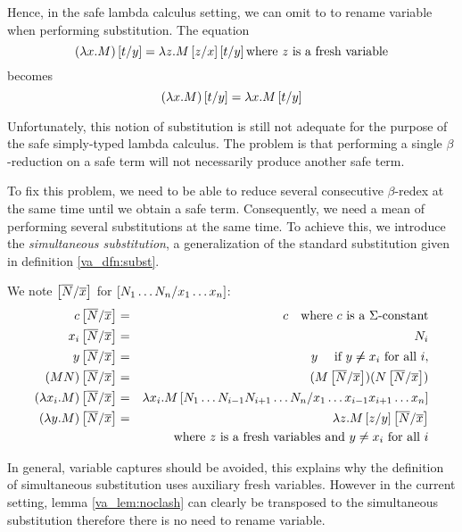 Hence, in the safe lambda calculus setting, we can omit to
to rename variable when performing substitution. The equation
$$(\lambda x . M) \left[ t/y \right] = \lambda z . M \left[ z/x \right]
\left[ t/y \right] \mbox{where $z$ is a fresh variable}$$
becomes
$$(\lambda x . M) \left[ t/y \right] = \lambda x . M \left[ t/y \right]$$



Unfortunately, this notion of substitution is still not adequate for
the purpose of the safe simply-typed lambda calculus. The problem is
that performing a single $\beta$-reduction on a safe term will not
necessarily produce another safe term.

To fix this problem, we need to be able to reduce several
consecutive $\beta$-redex at the same time until we obtain a safe
term. Consequently, we need a mean of performing several
substitutions at the same time. To achieve this, we introduce the
\emph{simultaneous substitution},
 a generalization of the standard substitution given in definition \ref{va_dfn:subst}.

\begin{dfn}
 We note $\left[ \overline{N}/\overline{x} \right]$ for $\left[ N_1 \ldots N_n/x_1
\ldots x_n \right]$:
\begin{eqnarray*}
c \left[ \overline{N}/\overline{x} \right] &=& c \quad \mbox{where $c$ is a $\Sigma$-constant}\\
x_i \left[ \overline{N}/\overline{x} \right] &=& N_i\\
 y \left[ \overline{N}/\overline{x} \right] &=& y \quad \mbox{ if } y \not \neq x_i \mbox{ for all } i,\\
(M N) \left[ \overline{N}/\overline{x} \right] &=& (M \left[ \overline{N}/\overline{x} \right]) (N \left[ \overline{N}/\overline{x} \right]) \\
(\lambda x_i . M) \left[ \overline{N}/\overline{x} \right] &=& \lambda x_i . M
\left[ N_1 \ldots N_{i-1} N_{i+1}\ldots N_n/x_1 \ldots x_{i-1} x_{i+1}\ldots x_n \right] \\
(\lambda y . M)
\left[ \overline{N}/\overline{x} \right] &=& \lambda z . M \left[ z/y \right] \left[ \overline{N}/\overline{x} \right] \\
&& \mbox{where $z$ is a fresh variables and } y \neq x_i \mbox{ for all } i
\end{eqnarray*}
\end{dfn}

In general, variable captures should be avoided, this explains why the definition
of simultaneous substitution uses auxiliary fresh variables.
However in the current setting, lemma \ref{va_lem:noclash} can clearly be transposed to
the simultaneous substitution therefore there is no need to rename variable.

